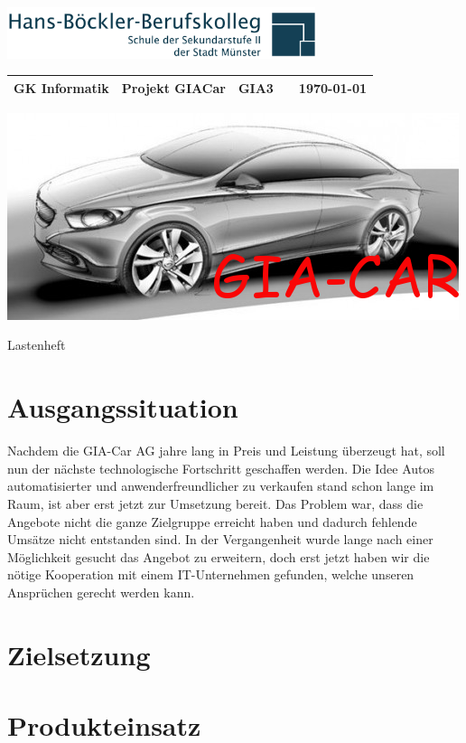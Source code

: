 \documentclass[12pt,a4paper]{scrartcl}
\begin{document}
\raggedleft\includegraphics[height=1.5cm]{images/hbbk-logo.png}
\\
\begin{tabular}{p{4cm} p{5cm} p{1.5cm} p{1.5cm} p{3cm}}
  \tabularnewline
  \textbf{GK Informatik} & \textbf{Projekt GIACar}    & GIA3    &  & {\today} \tabularnewline 
  \hline
\end{tabular}


\centering
\includegraphics[width=0.7\linewidth]{./images/GIAcar}

\centering\Huge{Lastenheft} \\

\flushleft
\normalsize

\section*{Ausgangssituation}
Nachdem die GIA-Car AG 
jahre lang in Preis und Leistung überzeugt hat, soll nun der
nächste technologische Fortschritt geschaffen werden. Die Idee Autos automatisierter und anwenderfreundlicher zu 
verkaufen stand schon lange im Raum, ist aber erst jetzt zur
Umsetzung bereit. Das Problem war, dass die Angebote nicht die ganze Zielgruppe erreicht haben und dadurch fehlende Umsätze nicht entstanden sind. In der Vergangenheit wurde lange nach einer Möglichkeit gesucht das Angebot zu erweitern, doch erst jetzt haben wir die nötige Kooperation mit einem IT-Unternehmen gefunden, welche unseren Ansprüchen
gerecht werden kann.

\section*{Zielsetzung}

\section*{Produkteinsatz}
\end{document}
